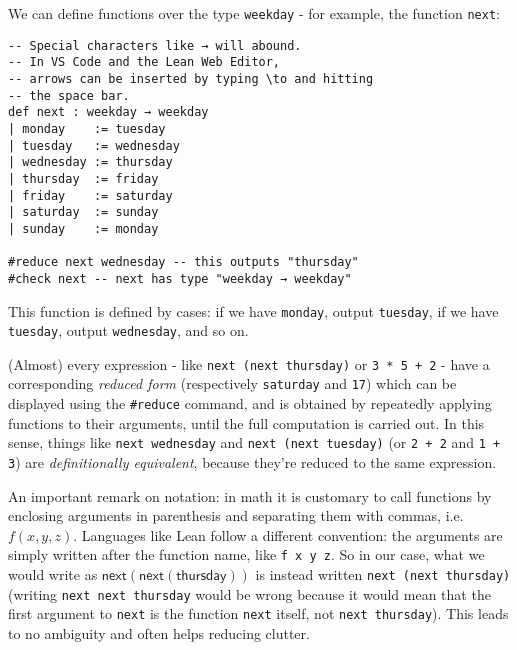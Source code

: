 \documentclass{book}
\theoremstyle{definition}
\theoremstyle{remark}
\theoremstyle{plain}
\begin{document}
We can define functions over the type \lstinline{weekday} -
for example, the function \lstinline{next}:

\begin{lstlisting}
-- Special characters like → will abound.
-- In VS Code and the Lean Web Editor,
-- arrows can be inserted by typing \to and hitting
-- the space bar. 
def next : weekday → weekday
| monday    := tuesday
| tuesday   := wednesday
| wednesday := thursday
| thursday  := friday
| friday    := saturday
| saturday  := sunday
| sunday    := monday

#reduce next wednesday -- this outputs "thursday"
#check next -- next has type "weekday → weekday"
\end{lstlisting}
This function is defined by cases:
if we have \lstinline{monday}, output \lstinline{tuesday},
if we have \lstinline{tuesday}, output \lstinline{wednesday}, and so on.

(Almost) every expression - like \lstinline{next (next thursday)} or \lstinline{3 * 5 + 2} -
have a corresponding \textit{reduced form} (respectively \lstinline{saturday} and \lstinline{17})
which can be displayed using the \lstinline{#reduce} command,
and is obtained by repeatedly applying functions to their arguments, until the full computation is carried out.
In this sense, things like \lstinline{next wednesday} and \lstinline{next (next tuesday)}
(or \lstinline{2 + 2} and \lstinline{1 + 3}) are \textit{definitionally equivalent}, because they're reduced to the same expression.

An important remark on notation:
in math it is customary to call functions by enclosing arguments in parenthesis and separating them with commas, i.e. $f(x,y,z)$.
Languages like Lean follow a different convention: the arguments are simply written after the function name, like \lstinline{f x y z}.
So in our case, what we would write as $\mathsf{next(next(thursday))}$ is instead written \lstinline{next (next thursday)}
(writing \lstinline{next next thursday} would be wrong
because it would mean that the first argument to \lstinline{next} is the function \lstinline{next} itself, not \lstinline{next thursday}).
This leads to no ambiguity and often helps reducing clutter.
\end{document}
